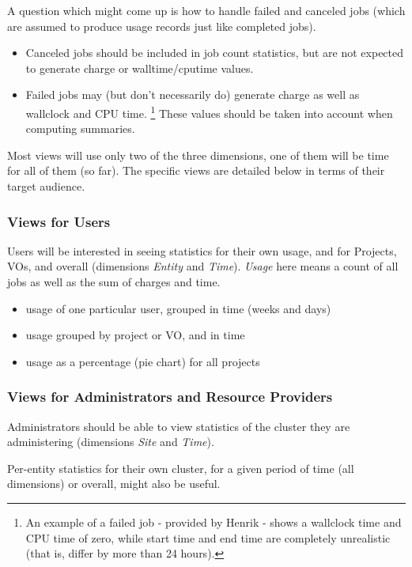 A question which might come up is how to handle failed and canceled
jobs (which are assumed to produce usage records just like completed
jobs).  
\begin{itemize}
  \item Canceled jobs should be included in job count statistics, but
    are not expected to generate charge or walltime/cputime
    values.

  \item Failed jobs may (but don't necessarily do) generate charge as
    well as wallclock and CPU time. \footnote{An example of a failed
      job - provided by Henrik - shows a wallclock time and CPU time
      of zero, while start time and end time are completely
      unrealistic (that is, differ by more than 24 hours).} These
    values should be taken into account when computing summaries.
\end{itemize}


Most views will use only two of the three dimensions, one of them will
be time for all of them (so far). The specific views are detailed
below in terms of their target audience.

\subsubsection*{Views for Users}

Users will be interested in seeing statistics for their own usage, and
for Projects, VOs, and overall (dimensions \emph{Entity} and
\emph{Time}). \emph{Usage} here means a count of all jobs as well as
the sum of charges and time.
\begin{itemize}
  \item usage of one particular user, grouped in time (weeks and days)
  \item usage grouped by project or VO, and in time
  \item usage as a percentage (pie chart) for all projects
\end{itemize}

\subsubsection*{Views for Administrators and Resource Providers}

Administrators should be able to view statistics of the cluster they
are administering (dimensions \emph{Site} and \emph{Time}).

Per-entity statistics for their own cluster, for a given period of
time (all dimensions) or overall, might also be useful.

